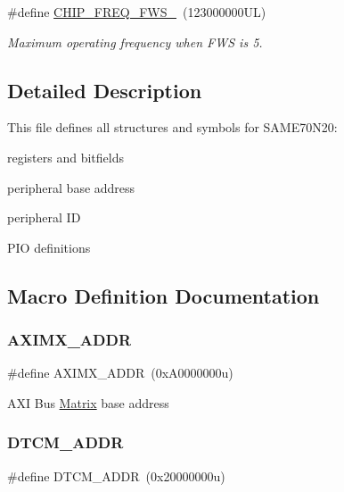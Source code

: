\begin{DoxyCompactItemize}
\mbox{\label{group__SAME70N20__definitions_ga3b66824f858591135877b369f98d48a5}} 
\#define \mbox{\hyperlink{group__SAME70N20__definitions_ga3b66824f858591135877b369f98d48a5}{C\+H\+I\+P\+\_\+\+F\+R\+E\+Q\+\_\+\+F\+W\+S\+\_}}~(123000000\+U\+L)
\begin{DoxyCompactList}\small\item\em Maximum operating frequency when F\+WS is 5. \end{DoxyCompactList}\end{DoxyCompactItemize}


\subsection{Detailed Description}
This file defines all structures and symbols for S\+A\+M\+E70\+N20\+:
\begin{DoxyItemize}
\item registers and bitfields
\item peripheral base address
\item peripheral ID
\item P\+IO definitions 
\end{DoxyItemize}

\subsection{Macro Definition Documentation}
\mbox{\label{group__SAME70N20__definitions_ga2fb7cc681bf5e7fbce5e3635b72a330a}} 
\subsubsection{\texorpdfstring{AXIMX\_ADDR}{AXIMX\_ADDR}}
{\footnotesize\ttfamily \#define A\+X\+I\+M\+X\+\_\+\+A\+D\+DR~(0x\+A0000000u)}

A\+XI Bus \mbox{\hyperlink{structMatrix}{Matrix}} base address \mbox{\label{group__SAME70N20__definitions_ga26626a425f7ebb3a0c2dbc276f0d9f78}} 
\subsubsection{\texorpdfstring{DTCM\_ADDR}{DTCM\_ADDR}}
{\footnotesize\ttfamily \#define D\+T\+C\+M\+\_\+\+A\+D\+DR~(0x20000000u)}

